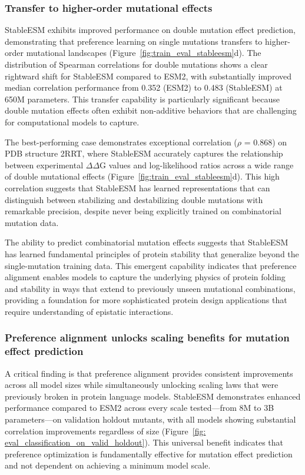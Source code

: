 \documentclass[]{fairmeta}
\begin{document}
\subsubsection{Transfer to higher-order mutational effects}
StableESM exhibits improved performance on double mutation effect prediction, demonstrating that preference learning on single mutations transfers to higher-order mutational landscapes (Figure~\ref{fig:train_eval_stableesm}d). The distribution of Spearman correlations for double mutations shows a clear rightward shift for StableESM compared to ESM2, with substantially improved median correlation performance from 0.352 (ESM2) to 0.483 (StableESM) at 650M parameters. This transfer capability is particularly significant because double mutation effects often exhibit non-additive behaviors that are challenging for computational models to capture.

The best-performing case demonstrates exceptional correlation ($\rho$ = 0.868) on PDB structure 2RRT, where StableESM accurately captures the relationship between experimental $\Delta\Delta$G values and log-likelihood ratios across a wide range of double mutational effects (Figure~\ref{fig:train_eval_stableesm}d). This high correlation suggests that StableESM has learned representations that can distinguish between stabilizing and destabilizing double mutations with remarkable precision, despite never being explicitly trained on combinatorial mutation data.

The ability to predict combinatorial mutation effects suggests that StableESM has learned fundamental principles of protein stability that generalize beyond the single-mutation training data. This emergent capability indicates that preference alignment enables models to capture the underlying physics of protein folding and stability in ways that extend to previously unseen mutational combinations, providing a foundation for more sophisticated protein design applications that require understanding of epistatic interactions.

\subsubsection{Preference alignment unlocks scaling benefits for mutation effect prediction}
A critical finding is that preference alignment provides consistent improvements across all model sizes while simultaneously unlocking scaling laws that were previously broken in protein language models. StableESM demonstrates enhanced performance compared to ESM2 across every scale tested—from 8M to 3B parameters—on validation holdout mutants, with all models showing substantial correlation improvements regardless of size (Figure~\ref{fig: eval_classification_on_valid_holdout}). This universal benefit indicates that preference optimization is fundamentally effective for mutation effect prediction and not dependent on achieving a minimum model scale.
\end{document}
